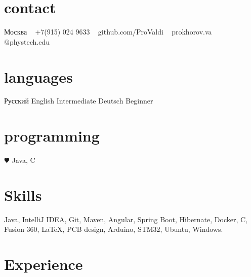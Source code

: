 \documentclass[]{cv-style}          %
\begin{document}
\lastupdated


\begin{aside}
%
\section{contact}
Москва
~
+7(915) 024 9633
~
github.com/ProValdi
~
prokhorov.va
@phystech.edu
%
\section{languages}
Русский
English Intermediate
Deutsch Beginner
%
\section{programming}
{\color{red} $\varheartsuit$} Java,
C
%
\end{aside}


\section{Skills}
  \vspace{-0.4cm}
Java, IntelliJ IDEA, Git, Maven, Angular, Spring Boot, Hibernate, Docker, C, Fusion 360, \LaTeX{}, PCB design, Arduino, STM32, Ubuntu, Windows.


\section{Experience}
\end{document}
